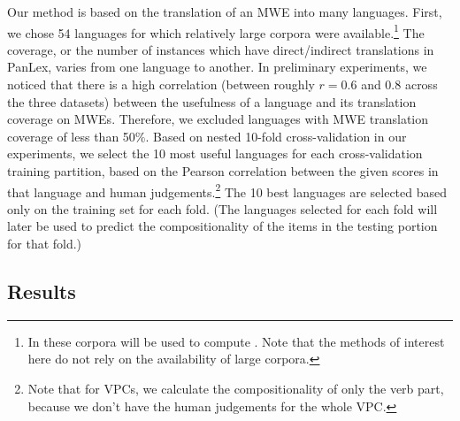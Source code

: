 \documentclass[output=paper,modfonts,nonflat]{langsci/langscibook}
\begin{document}
Our method is based on the translation of an MWE into many
languages. First, we chose 54 languages for which
relatively large corpora were available.\footnote{In
   these corpora will be used to compute
  . Note that the  methods of interest here do not rely on the
  availability of large corpora.} The coverage, or the number of
instances which have direct/indirect translations in PanLex, varies
from one language to another. In preliminary experiments, we noticed
that there is a high correlation (between roughly $r = 0.6$ and 0.8 across
the three datasets) between the usefulness of a language and its
translation coverage on MWEs. Therefore, we excluded languages with
MWE translation coverage of less than 50\%. Based on nested 10-fold
cross-validation in our experiments, we select the 10 most useful
languages for each cross-validation training partition, based on the
Pearson correlation between the given scores in that language and
human judgements.\footnote{Note that for VPCs, we calculate the
  compositionality of only the verb part, because we don't have the
  human judgements for the whole VPC.}  The 10 best languages are
selected based only on the training set for each fold. (The languages
selected for each fold will later be used to predict the
compositionality of the items in the testing portion for that fold.)




\subsection{Results\label{sec:ss:results}}
\end{document}
